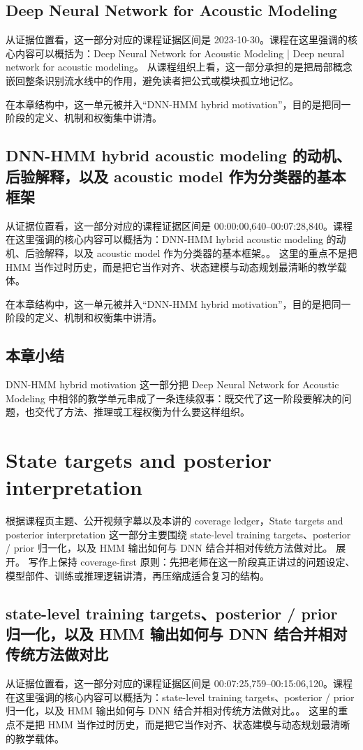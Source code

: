 \documentclass[a4paper]{article}
\begin{document}
\subsection{Deep Neural Network for Acoustic Modeling}
从证据位置看，这一部分对应的课程证据区间是 2023-10-30。课程在这里强调的核心内容可以概括为：Deep Neural Network for Acoustic Modeling | Deep neural network for acoustic modeling。
从课程组织上看，这一部分承担的是把局部概念嵌回整条识别流水线中的作用，避免读者把公式或模块孤立地记忆。

在本章结构中，这一单元被并入“DNN-HMM hybrid motivation”，目的是把同一阶段的定义、机制和权衡集中讲清。

\subsection{DNN-HMM hybrid acoustic modeling 的动机、后验解释，以及 acoustic model 作为分类器的基本框架}
从证据位置看，这一部分对应的课程证据区间是 00:00:00,640--00:07:28,840。课程在这里强调的核心内容可以概括为：DNN-HMM hybrid acoustic modeling 的动机、后验解释，以及 acoustic model 作为分类器的基本框架。。
这里的重点不是把 HMM 当作过时历史，而是把它当作对齐、状态建模与动态规划最清晰的教学载体。

在本章结构中，这一单元被并入“DNN-HMM hybrid motivation”，目的是把同一阶段的定义、机制和权衡集中讲清。

\subsection{本章小结}
DNN-HMM hybrid motivation 这一部分把 Deep Neural Network for Acoustic Modeling 中相邻的教学单元串成了一条连续叙事：既交代了这一阶段要解决的问题，也交代了方法、推理或工程权衡为什么要这样组织。

\section{State targets and posterior interpretation}
根据课程页主题、公开视频字幕以及本讲的 coverage ledger，State targets and posterior interpretation 这一部分主要围绕 state-level training targets、posterior / prior 归一化，以及 HMM 输出如何与 DNN 结合并相对传统方法做对比。 展开。
写作上保持 coverage-first 原则：先把老师在这一阶段真正讲过的问题设定、模型部件、训练或推理逻辑讲清，再压缩成适合复习的结构。

\subsection{state-level training targets、posterior / prior 归一化，以及 HMM 输出如何与 DNN 结合并相对传统方法做对比}
从证据位置看，这一部分对应的课程证据区间是 00:07:25,759--00:15:06,120。课程在这里强调的核心内容可以概括为：state-level training targets、posterior / prior 归一化，以及 HMM 输出如何与 DNN 结合并相对传统方法做对比。。
这里的重点不是把 HMM 当作过时历史，而是把它当作对齐、状态建模与动态规划最清晰的教学载体。
\end{document}
